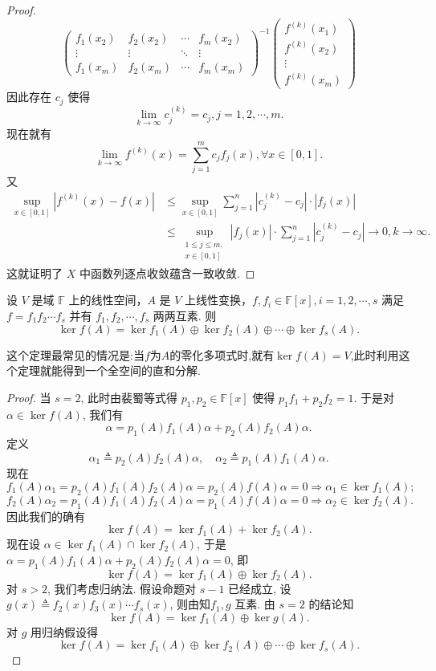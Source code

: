 \documentclass[../../main.tex]{subfiles}
\begin{document}
\begin{proof}
\[\begin{pmatrix}
f_1(x_2) & f_2(x_2) & \cdots & f_m(x_2) \\
\vdots & \vdots & \ddots & \vdots \\
f_1(x_m) & f_2(x_m) & \cdots & f_m(x_m)
\end{pmatrix}^{-1}
\begin{pmatrix}
f^{(k)}(x_1) \\
f^{(k)}(x_2) \\
\vdots \\
f^{(k)}(x_m)
\end{pmatrix}
\]
因此存在 \( c_j \) 使得
\[
\lim_{k \to \infty} c_j^{(k)} = c_j, j = 1, 2, \cdots, m.
\]
现在就有
\[
\lim_{k \to \infty} f^{(k)}(x) = \sum_{j=1}^m c_j f_j(x), \forall x \in [0,1].
\]
又
\[
\begin{aligned}
\sup_{x \in [0,1]} \left| f^{(k)}(x) - f(x) \right| &\leqslant \sup_{x \in [0,1]} \sum_{j=1}^n \left| c_j^{(k)} - c_j \right| \cdot \left| f_j(x) \right| \\
&\leqslant \sup_{\substack{1 \leqslant j \leqslant m, \\ x \in [0,1]}} \left| f_j(x) \right| \cdot \sum_{j=1}^n \left| c_j^{(k)} - c_j \right| \to 0, k \to \infty.
\end{aligned}
\]
这就证明了 \( X \) 中函数列逐点收敛蕴含一致收敛.

\end{proof}

\begin{theorem}\label{theorem:线性变换互素分解对应核子空间直和分解}
设 $V$ 是域 $\mathbb{F}$ 上的线性空间，$A$ 是 $V$ 上线性变换，$f, f_i \in \mathbb{F}[x], i = 1,2,\cdots, s$ 满足 $f = f_1f_2\cdots f_s$ 并有 $f_1, f_2, \cdots, f_s$ 两两互素. 则
$$\ker f(A) = \ker f_1(A) \oplus \ker f_2(A) \oplus \cdots \oplus \ker f_s(A).$$
\end{theorem}
\begin{note}
这个定理最常见的情况是:当$f$为$A$的零化多项式时,就有$\ker f(A)=V$,此时利用这个定理就能得到一个全空间的直和分解.
\end{note}
\begin{proof}
当 $s = 2$, 此时由裴蜀等式得 $p_1, p_2 \in \mathbb{F}[x]$ 使得 $p_1f_1 + p_2f_2 = 1$. 于是对 $\alpha \in \ker f(A)$, 我们有
$$\alpha = p_1(A)f_1(A)\alpha + p_2(A)f_2(A)\alpha.$$
定义
$$\alpha_1 \triangleq p_2(A)f_2(A)\alpha,\quad \alpha_2 \triangleq p_1(A)f_1(A)\alpha.$$
现在
$$f_1(A)\alpha_1 = p_2(A)f_1(A)f_2(A)\alpha = p_2(A)f(A)\alpha = 0 \Rightarrow \alpha_1 \in \ker f_1(A);$$
$$f_2(A)\alpha_2 = p_1(A)f_1(A)f_2(A)\alpha = p_1(A)f(A)\alpha = 0 \Rightarrow \alpha_2 \in \ker f_2(A).$$
因此我们的确有
$$\ker f(A) = \ker f_1(A) + \ker f_2(A).$$
现在设 $\alpha \in \ker f_1(A) \cap \ker f_2(A)$, 于是 $\alpha = p_1(A)f_1(A)\alpha + p_2(A)f_2(A)\alpha = 0$, 即
$$\ker f(A) = \ker f_1(A) \oplus \ker f_2(A).$$
对 $s > 2$, 我们考虑归纳法. 假设命题对 $s - 1$ 已经成立, 设 $g(x) \triangleq f_2(x)f_3(x)\cdots f_s(x)$, 则由知$f_1, g$ 互素. 由 $s = 2$ 的结论知
$$\ker f(A) = \ker f_1(A) \oplus \ker g(A).$$
对 $g$ 用归纳假设得
$$\ker f(A) = \ker f_1(A) \oplus \ker f_2(A) \oplus \cdots \oplus \ker f_s(A).$$

\end{proof}
\end{document}
